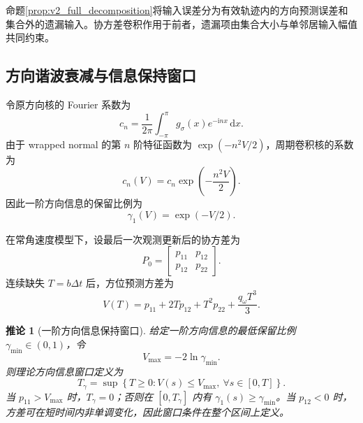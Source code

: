 \documentclass[UTF8,fontset=windows,11pt]{ctexart}
\newtheorem{corollary}[theorem]{推论}
\begin{document}
命题\ref{prop:v2_full_decomposition}将输入误差分为有效轨迹内的方向预测误差和集合外的遗漏输入。协方差卷积作用于前者，遗漏项由集合大小与单邻居输入幅值共同约束。



\subsection{方向谐波衰减与信息保持窗口}

令原方向核的 Fourier 系数为
\begin{equation}
 c_n=\frac{1}{2\pi}\int_{-\pi}^{\pi}g_\sigma(x)e^{-\mathrm inx}\,\mathrm dx .
 \label{eq:v2_fourier_coeff}
\end{equation}
由于 wrapped normal 的第 $n$ 阶特征函数为 $\exp(-n^2V/2)$，周期卷积核的系数为
\begin{equation}
 c_n(V)=c_n\exp\left(-\frac{n^2V}{2}\right).
 \label{eq:v2_harmonic_decay}
\end{equation}
因此一阶方向信息的保留比例为
\begin{equation}
 \gamma_1(V)=\exp(-V/2).
 \label{eq:v2_first_harmonic}
\end{equation}

在常角速度模型下，设最后一次观测更新后的协方差为
\begin{equation}
 P_0=\begin{bmatrix}p_{11}&p_{12}\\p_{12}&p_{22}\end{bmatrix}.
 \label{eq:v2_p0}
\end{equation}
连续缺失 $T=b\Delta t$ 后，方位预测方差为
\begin{equation}
 V(T)=p_{11}+2Tp_{12}+T^2p_{22}+\frac{q_\omega T^3}{3}.
 \label{eq:v2_vt}
\end{equation}

\begin{corollary}[一阶方向信息保持窗口]
\label{cor:v2_direction_window}
给定一阶方向信息的最低保留比例 $\gamma_{\min}\in(0,1)$，令
\begin{equation}
 V_{\max}=-2\ln\gamma_{\min}.
 \label{eq:v2_vmax}
\end{equation}
则理论方向信息窗口定义为
\begin{equation}
 T_\gamma=\sup\left\{T\ge0:
 V(s)\le V_{\max},\ \forall s\in[0,T]\right\}.
 \label{eq:v2_tgamma}
\end{equation}
当 $p_{11}>V_{\max}$ 时，$T_\gamma=0$；否则在 $[0,T_\gamma]$ 内有 $\gamma_1(s)\ge\gamma_{\min}$。当 $p_{12}<0$ 时，方差可在短时间内非单调变化，因此窗口条件在整个区间上定义。
\end{corollary}
\end{document}
